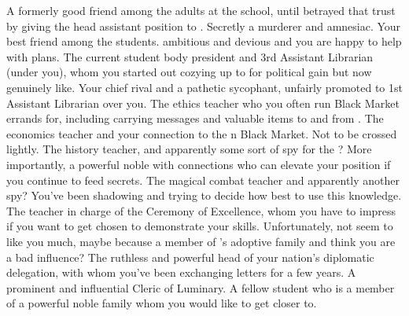 \documentclass[char]{GL2020}
\begin{document}
\begin{contacts}
    \contact{\cLibrarian{}} A formerly good friend among the adults at the school, until \cLibrarian{\they} betrayed that trust by giving the head assistant position to \cAmbition{}. Secretly a murderer and amnesiac.
    \contact{\cAdopted{}} Your best friend among the students. \cAdopted{\They} \cAdopted{\are} ambitious and devious and you are happy to help \cAdopted{\them} with \cAdopted{\their} plans.
    \contact{\cPresident{}} The current student body president and 3rd Assistant Librarian (under you), whom you started out cozying up to for political gain but now genuinely like.
    \contact{\cAmbition{}} Your chief rival and a pathetic sycophant, unfairly promoted to 1st Assistant Librarian over you.
    \contact{\cEthics{}} The ethics teacher who you often run Black Market errands for, including carrying messages and valuable items to and from \cChupSecond{}.
    \contact{\cChupSecond{}} The economics teacher and your connection to the \pEarth{}n Black Market. Not to be crossed lightly. 
    \contact{\cHistory{}} The history teacher, and apparently some sort of spy for the \pFarm{}? More importantly, a powerful noble with connections who can elevate your position if you continue to feed \cHistory{\them} secrets.
    \contact{\cInterpol{}} The magical combat teacher and apparently another spy? You've been shadowing \cInterpol{} and trying to decide how best to use this knowledge. 
    \contact{\cMusic{}} The teacher in charge of the Ceremony of Excellence, whom you have to impress if you want to get chosen to demonstrate your skills. Unfortunately, \cMusic{\they} \cMusic{\do} not seem to like you much, maybe because \cMusic{\they} \cMusic{\are} a member of \cAdopted{}’s adoptive family and think\cMusic{\verbs} you are a bad influence?
    \contact{\cEvil{}} The ruthless and powerful head of your nation’s diplomatic delegation, with whom you’ve been exchanging letters for a few years.
    \contact{\cHedonist{}} A prominent and influential Cleric of Luminary.
    \contact{\cChupStudent{}} A fellow student who is a member of a powerful noble family whom you would like to get closer to.
\end{contacts}
\end{document}
